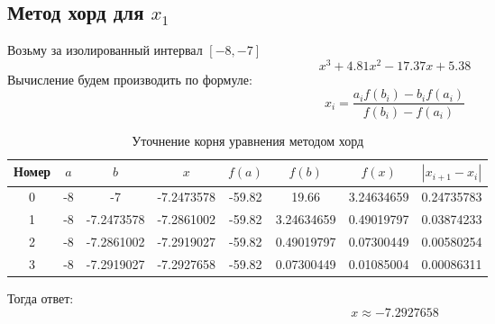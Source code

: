 \documentclass{article}
\begin{document}
      \subsection{Метод хорд для $x_1$}
            Возьму за изолированный интервал $[-8, -7]$
            $$x^3+4.81x^2-17.37x+5.38$$
            Вычисление будем производить по формуле:
            \[
            x_i = \frac{a_if(b_i) - b_if(a_i)}{f(b_i) - f(a_i)}
            \]
            \begin{table}[H]
            \centering
                  \begin{tabular}{|*{8}{c|}}
                        \hline
                        Номер & $a$ & $b$ & $x$& $f(a)$& $f(b)$& $f(x)$& $|x_{i+1} - x_i|$  \\
                        \hline
                        0 & -8 & -7         & -7.2473578 & -59.82 & 19.66      & 3.24634659 & 0.24735783 \\ \hline
                        1 & -8 & -7.2473578 & -7.2861002 & -59.82 & 3.24634659 & 0.49019797 & 0.03874233 \\ \hline
                        2 & -8 & -7.2861002 & -7.2919027 & -59.82 & 0.49019797 & 0.07300449 & 0.00580254 \\ \hline
                        3 & -8 & -7.2919027 & -7.2927658 & -59.82 & 0.07300449 & 0.01085004 & 0.00086311 \\ \hline
                  \end{tabular}
            \caption{Уточнение корня уравнения методом хорд}
            \end{table}
            Тогда ответ:
            \[x \approx -7.2927658\]
\end{document}

